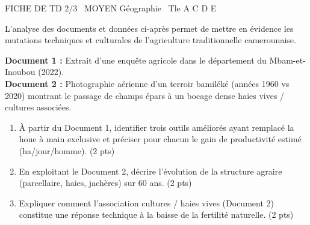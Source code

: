 \documentclass[11pt]{article}
\begin{document}
\begin{tcolorbox}[enhanced,colback=popink,colframe=popink,arc=10pt,boxrule=0pt,left=12pt,right=12pt,top=9pt,bottom=9pt]
{\color{white}\popxbold\small FICHE DE TD 2/3 \textbullet\ MOYEN \hfill Géographie \textbullet\ Tle A C D E\par}
\end{tcolorbox}
\vspace{4pt}
L'analyse des documents et données ci-après permet de mettre en évidence les mutations techniques et culturales de l'agriculture traditionnelle camerounaise.

\begin{exercice}
\textbf{Document 1 :} Extrait d'une enquête agricole dans le département du Mbam-et-Inoubou (2022).\\
\textbf{Document 2 :} Photographie aérienne d'un terroir bamiléké (années 1960 vs 2020) montrant le passage de champs épars à un bocage dense haies vives / cultures associées.
\begin{enumerate}
    \item À partir du Document 1, identifier trois outils améliorés ayant remplacé la houe à main exclusive et préciser pour chacun le gain de productivité estimé (ha/jour/homme). (2 pts)
    \item En exploitant le Document 2, décrire l'évolution de la structure agraire (parcellaire, haies, jachères) sur 60 ans. (2 pts)
    \item Expliquer comment l'association cultures / haies vives (Document 2) constitue une réponse technique à la baisse de la fertilité naturelle. (2 pts)
\end{enumerate}
\end{exercice}
\end{document}
